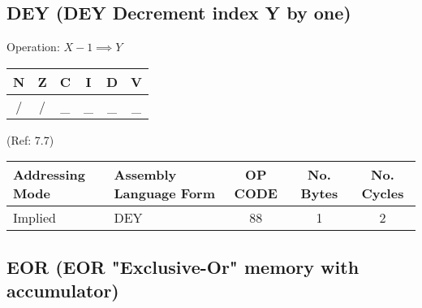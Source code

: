 \documentclass{article}
\begin{document}
  \subsection{DEY (DEY Decrement index Y by one)}

  Operation:  $X - 1 \implies Y$
  \begin{table}[H]
  \centering
  \begin{tabular}{|c c c c c c|}
  \hline
  N&Z&C&I&D&V\\
  \hline
  / & / & \_ & \_ & \_ & \_\\
  \hline
  \end{tabular}
  \end{table}
                                 (Ref: 7.7)
  \begin{table}[H]
  \centering
  \begin{tabular}{|l|l|c|c|c|}
  \hline
   Addressing Mode& Assembly Language Form& OP CODE &No. Bytes&No. Cycles\\
  \hline
    Implied       &   DEY                 &    88   &    1    &    2     \\
  \hline
  \end{tabular}
  \end{table}

  \subsection{EOR (EOR "Exclusive-Or" memory with accumulator)}
\end{document}
